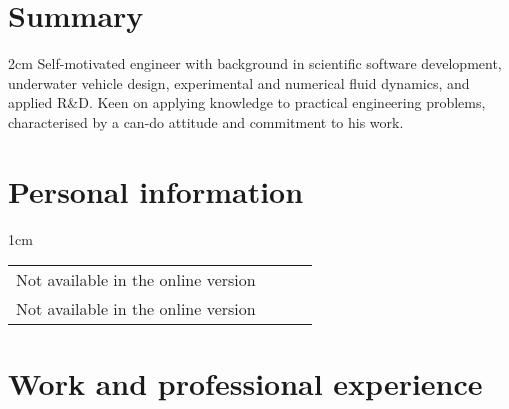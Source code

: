 \documentclass[a4paper,10pt]{article}
\begin{document}
\pagestyle{empty} %

\par{\par\par}

\section{Summary}

\hspace{1cm}
\begin{minipage}{\textwidth}
\begin{adjustwidth}{}{2cm} %
	Self-motivated engineer with background in scientific
		software development, underwater vehicle design, experimental
		and numerical fluid dynamics, and applied R\&D.
	Keen on applying knowledge to practical engineering problems,
		characterised by a can-do attitude and commitment to his work.
\end{adjustwidth}
\end{minipage}

\section{Personal information}

\begin{minipage}{\textwidth}
\begin{adjustwidth}{}{1cm} %

%

\begin{tabular}{l l l l}
Not available in the online version & & & \\
Not available in the online version & & & \\
\end{tabular}

\end{adjustwidth}
\end{minipage}


\section{Work and professional experience}
\end{document}
